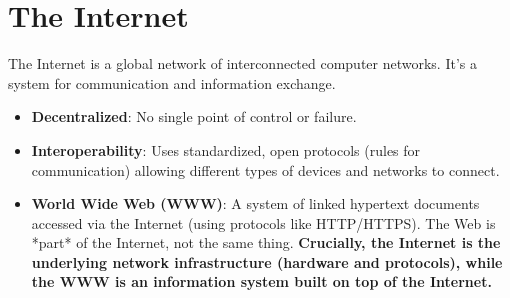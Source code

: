\documentclass[11pt,oneside]{book}
\begin{document}
\section{The Internet}
\label{sec:internet}
The Internet is a global network of interconnected computer networks. It's a system for communication and information exchange.
\begin{itemize}
    \item \textbf{Decentralized}: No single point of control or failure.
    \item \textbf{Interoperability}: Uses standardized, open protocols (rules for communication) allowing different types of devices and networks to connect.
    \item \textbf{World Wide Web (WWW)}: A system of linked hypertext documents accessed via the Internet (using protocols like HTTP/HTTPS). The Web is *part* of the Internet, not the same thing. \textbf{Crucially, the Internet is the underlying network infrastructure (hardware and protocols), while the WWW is an information system built on top of the Internet.}
\end{itemize}
\end{document}
